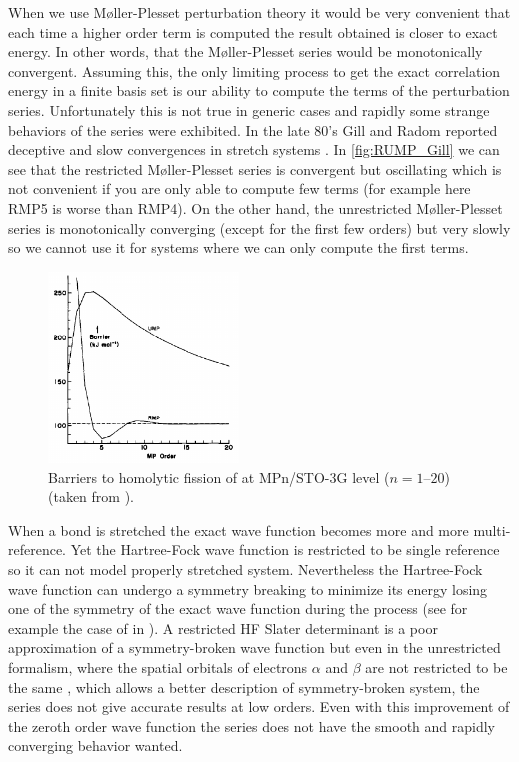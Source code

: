 \documentclass[11pt,a4paper]{article}
\begin{document}
When we use M{\o}ller-Plesset perturbation theory it would be very convenient that each time a higher order term is computed the result obtained is closer to exact energy. In other words, that the M{\o}ller-Plesset series would be monotonically convergent. Assuming this, the only limiting process to get the exact correlation energy in a finite basis set is our ability to compute the terms of the perturbation series.
Unfortunately this is not true in generic cases and rapidly some strange behaviors of the series were exhibited. In the late 80's Gill and Radom reported deceptive and slow convergences in stretch systems \cite{Gill_1986, Gill_1988, Handy_1985, Lepetit_1988}. 
In \autoref{fig:RUMP_Gill} we can see that the restricted M{\o}ller-Plesset series is convergent but oscillating which is not convenient if you are only able to compute few terms (for example here RMP5 is worse than RMP4). 
On the other hand, the unrestricted M{\o}ller-Plesset series is monotonically converging (except for the first few orders) but very slowly so we cannot use it for systems where we can only compute the first terms.

\begin{figure}[h!]
    \centering
    \includegraphics[width=0.45\textwidth]{gill1986.png}
    \caption{\centering Barriers to homolytic fission of  at MPn/STO-3G level ($n = 1$--$20$) (taken from \cite{Gill_1986}).}
    \label{fig:RUMP_Gill}
\end{figure}

When a bond is stretched the exact wave function becomes more and more multi-reference. Yet the Hartree-Fock wave function is restricted to be single reference so it can not model properly stretched system. Nevertheless the Hartree-Fock wave function can undergo a symmetry breaking to minimize its energy losing one of the symmetry of the exact wave function during the process (see for example the case of  in \cite{SzaboBook}). A restricted HF Slater determinant is a poor approximation of a symmetry-broken wave function but even in the unrestricted formalism, where the spatial orbitals of electrons $\alpha$ and $\beta$ are not restricted to be the same \cite{Fukutome_1981}, which allows a better description of symmetry-broken system, the series does not give accurate results at low orders. Even with this improvement of the zeroth order wave function the series does not have the smooth and rapidly converging behavior wanted. 
\end{document}
